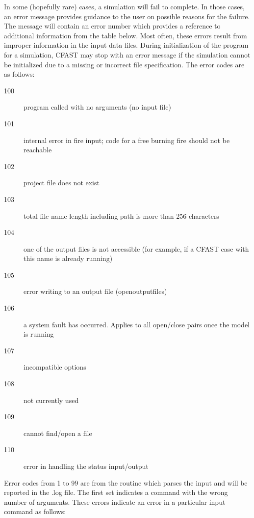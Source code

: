 In some (hopefully rare) cases, a simulation will fail to complete. In those cases, an error message provides guidance to the user on possible reasons for the failure. The message will contain an error number which provides a reference to additional information from the table below. Most often, these errors result from improper information in the input data files.
During initialization of the program for a simulation, CFAST may stop with an error message if the simulation cannot be initialized due to a missing or incorrect file specification. The error codes are as follows:
\begin{description}
\item[100] program called with no arguments (no input file)
\item[101] internal error in fire input; code for a free burning fire should not be reachable
\item[102] project file does not exist
\item[103] total file name length including path  is more than 256 characters
\item[104] one of the output files is not accessible (for example, if a CFAST case with this name is already running)
\item[105] error writing to an output file (openoutputfiles)
\item[106] a system fault has occurred. Applies to all open/close pairs once the model is running
\item[107] incompatible options
\item[108] not currently used
\item[109] cannot find/open a file
\item[110] error in handling the status input/output
\end{description}
Error codes from 1 to 99 are from the routine which parses the input and will be reported in the .log file.  The first set indicates a command with the wrong number of arguments. These errors indicate an error in a particular input command as follows:
